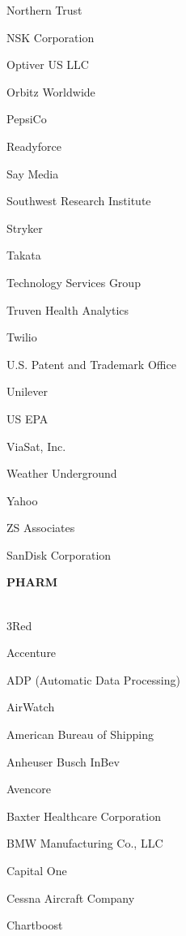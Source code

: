 \documentclass[twoside]{article}
\begin{document}
\begin{center}
\begin{multicols}{5}
\begin{FlushLeft}
\begin{compactitem}
\item Northern Trust
\item NSK Corporation
\item Optiver US LLC
\item Orbitz Worldwide
\item PepsiCo
\item Readyforce
\item Say Media
\item Southwest Research Institute
\item Stryker
\item Takata
\item Technology Services Group
\item Truven Health Analytics
\item Twilio
\item U.S. Patent and Trademark Office
\item Unilever
\item US EPA
\item ViaSat, Inc.
\item Weather Underground
\item Yahoo
\item ZS Associates
\item SanDisk Corporation
\end{compactitem}
        \end{FlushLeft}
        \vspace{1em}
        {\fontsize{14}{16}\selectfont \bf PHARM}\\
        \vspace{-1em}
        ~\hrulefill~
        \vspace{-.9em}
        \begin{FlushLeft}
        \begin{compactitem}
        \item 3Red
\item Accenture
\item ADP (Automatic Data Processing)
\item AirWatch
\item American Bureau of Shipping
\item Anheuser Busch InBev
\item Avencore
\item Baxter Healthcare Corporation
\item BMW Manufacturing Co., LLC
\item Capital One
\item Cessna Aircraft Company
\item Chartboost

\end{compactitem}
\end{FlushLeft}
\end{multicols}
\end{center}
\end{document}
